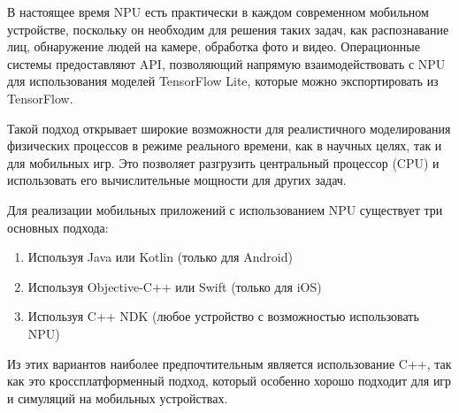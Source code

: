 В настоящее время NPU есть практически в каждом современном мобильном устройстве, поскольку он необходим для решения таких 
задач, как распознавание лиц, обнаружение людей на камере, обработка фото и видео. Операционные системы предоставляют API, 
позволяющий напрямую взаимодействовать с NPU для использования моделей TensorFlow Lite, которые можно экспортировать из TensorFlow\cite{nnapi}.

Такой подход открывает широкие возможности для реалистичного моделирования физических процессов в режиме реального времени,
как в научных целях, так и для мобильных игр. Это позволяет разгрузить центральный процессор (CPU) и использовать его
вычислительные мощности для других задач.

Для реализации мобильных приложений с использованием NPU существует три основных подхода:
\begin{enumerate}
    \item Используя Java или Kotlin (только для Android)
    \item Используя Objective-C++ или Swift (только для iOS)
    \item Используя C++ NDK (любое устройство с возможностью использовать NPU)
\end{enumerate} 

Из этих вариантов наиболее предпочтительным является использование C++, так как это кроссплатформенный подход,
который особенно хорошо подходит для игр и симуляций на мобильных устройствах.

